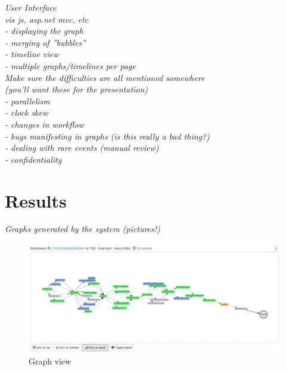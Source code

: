 \documentclass[english,12pt,a4paper,pdftex,sci,utf8]{aaltothesis}
\theoremstyle{definition}
\newcommand{\nyi}[1]{\noindent\colorbox{nyibg}{\textcolor{nyitext}{\emph{#1}}}}
\begin{document}
\nyi{User Interface}\\
\nyi{vis js, asp.net mvc, etc}\\
\nyi{ - displaying the graph}\\
\nyi{ - merging of ''bubbles''}\\
\nyi{ - timeline view}\\
\nyi{ - multiple graphs/timelines per page}\\

\nyi{Make sure the difficulties are all mentioned somewhere}\\
\nyi{(you'll want these for the presentation)}\\
\nyi{ - parallelism}\\
\nyi{ - clock skew}\\
\nyi{ - changes in workflow}\\
\nyi{ - bugs manifesting in graphs (is this really a bad thing?)}\\
\nyi{ - dealing with rare events (manual review)}\\
\nyi{ - confidentiality}\\



\clearpage
\section{Results}
\label{sec:results}


\nyi{Graphs generated by the system (pictures!)}

\begin{figure}[htb]
\centering \includegraphics[width=\linewidth]{gfx/graph.png}
\caption{Graph view \label{fig:graph}}
\end{figure}
\end{document}
